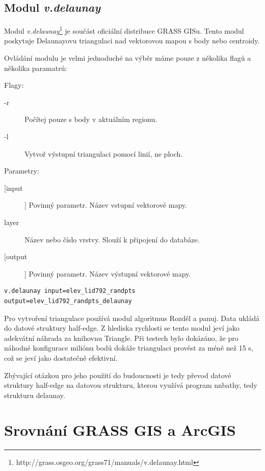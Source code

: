 \documentclass[12pt,a4paper]{article}
\begin{document}
\newpage
\subsection{Modul \emph{v.delaunay}}
Modul \emph{v.delaunay}\footnote{http://grass.osgeo.org/grass71/manuals/v.delaunay.html} je součást oficiální distribuce GRASS GISu. Tento modul poskytuje Delaunayovu triangulaci nad vektorovou mapou s body nebo centroidy. 

Ovládání modulu je velmi jednoduché na výběr máme pouze z několika flagů a několika paramatrů:

\bigskip
Flagy:
\begin{description}
\item[-r] Počítej pouze s body v aktuálním regionu.
\item[-l] Vytvoř výstupní triangulaci pomocí linií, ne ploch.
\end{description}
\bigskip
Parametry:
\begin{description}
\item[[input]] Povinný parametr. Název vstupní vektorové mapy.
\item[layer] Název nebo číslo vrstvy. Slouží k připojení do databáze.
\item[[output]] Povinný parametr. Název výstupní vektorové mapy.
\end{description}

\begin{lstlisting}[caption={Volání modulu v.delaunay z příkazové řádky}]
v.delaunay input=elev_lid792_randpts output=elev_lid792_randpts_delaunay
\end{lstlisting}


Pro vytvoření triangulace používá modul algoritmus Rozděl a panuj. Data ukládá do datové struktury half-edge. Z hlediska rychlosti se tento modul jeví jako adekvátní náhrada za knihovnu Triangle. Při testech bylo dokázáno, že pro náhodné konfigurace miliónu bodů dokáže triangulaci provést za méně než 15 s, což se jeví jako dostatečně efektivní.

Zbývající otázkou pro jeho použití do budoucnosti je tedy převod datové struktury half-edge na datovou strukturu, kterou využívá program nnbathy, tedy strukturu delaunay.


\newpage
\section{Srovnání GRASS GIS a ArcGIS}
\end{document}
